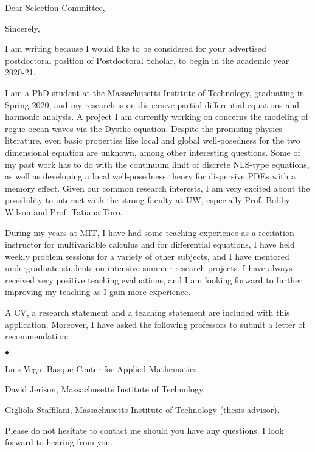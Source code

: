 %
%

\date{\today}
\opening{Dear Selection Committee,}
\closing{Sincerely,}
\makelettertitle

\justifying 

I am writing because I would like to be considered for your advertised postdoctoral position of Postdoctoral Scholar, to begin in the academic year 2020-21.

I am a PhD student at the Massachusetts Institute of Technology, graduating in Spring 2020, and my research is on dispersive partial differential equations and harmonic analysis. A project I am currently working on concerns the modeling of rogue ocean waves via the Dysthe equation. Despite the promising physics literature, even basic properties like local and global well-posedness for the two dimensional equation are unknown, among other interesting questions. Some of my past work has to do with the continuum limit of discrete NLS-type equations, as well as developing a local well-posedness theory for dispersive PDEs with a memory effect. Given our common research interests, I am very excited about the possibility to interact with the strong faculty at UW, especially Prof. Bobby Wilson and Prof. Tatiana Toro.

During my years at MIT, I have had some teaching experience as a recitation instructor for multivariable calculus and for differential equations, I have held weekly problem sessions for a variety of other subjects, and I have mentored undergraduate students on intensive summer research projects. I have always received very positive teaching evaluations, and I am looking forward to further improving my teaching as I gain more experience.

A CV, a research statement and a teaching statement are included with this application. Moreover, I have asked the following professors to submit a letter of recommendation:
\begin{list}{$\bullet$}{}
\item Luis Vega, Basque Center for Applied Mathematics.
\item David Jerison, Massachusetts Institute of Technology.
\item Gigliola Staffilani, Massachusetts Institute of Technology (thesis advisor). 
\end{list}

Please do not hesitate to contact me should you have any questions. I look forward to hearing from you.

\hspace{1.5cm}

\makeletterclosing

\clearpage

